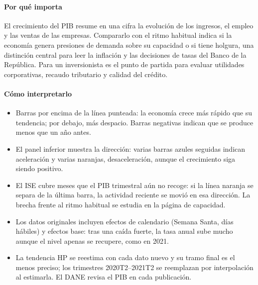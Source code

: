 \paragraph{Por qué importa}
El crecimiento del PIB resume en una cifra la evolución de los ingresos, el empleo y las ventas de las empresas. Compararlo con el ritmo habitual indica si la economía genera presiones de demanda sobre su capacidad o si tiene holgura, una distinción central para leer la inflación y las decisiones de tasas del Banco de la República. Para un inversionista es el punto de partida para evaluar utilidades corporativas, recaudo tributario y calidad del crédito.

\paragraph{Cómo interpretarlo}
\begin{itemize}
\item Barras por encima de la línea punteada: la economía crece más rápido que su tendencia; por debajo, más despacio. Barras negativas indican que se produce menos que un año antes.
\item El panel inferior muestra la dirección: varias barras azules seguidas indican aceleración y varias naranjas, desaceleración, aunque el crecimiento siga siendo positivo.
\item El ISE cubre meses que el PIB trimestral aún no recoge: si la línea naranja se separa de la última barra, la actividad reciente se movió en esa dirección. La brecha frente al ritmo habitual se estudia en la página de capacidad.
\item Los datos originales incluyen efectos de calendario (Semana Santa, días hábiles) y efectos base: tras una caída fuerte, la tasa anual sube mucho aunque el nivel apenas se recupere, como en 2021.
\item La tendencia HP se reestima con cada dato nuevo y su tramo final es el menos preciso; los trimestres 2020T2–2021T2 se reemplazan por interpolación al estimarla. El DANE revisa el PIB en cada publicación.
\end{itemize}
